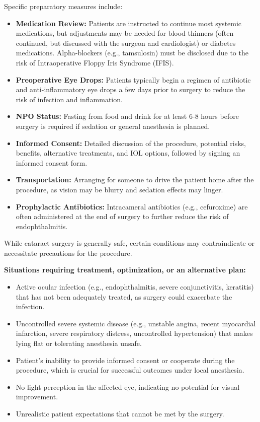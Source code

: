 Specific preparatory measures include:

\begin{itemize}
  \item \textbf{Medication Review:} Patients are instructed to continue most systemic medications, but adjustments may be needed for blood thinners (often continued, but discussed with the surgeon and cardiologist) or diabetes medications. Alpha-blockers (e.g., tamsulosin) must be disclosed due to the risk of Intraoperative Floppy Iris Syndrome (IFIS).
  \item \textbf{Preoperative Eye Drops:} Patients typically begin a regimen of antibiotic and anti-inflammatory eye drops a few days prior to surgery to reduce the risk of infection and inflammation.
  \item \textbf{NPO Status:} Fasting from food and drink for at least 6-8 hours before surgery is required if sedation or general anesthesia is planned.
  \item \textbf{Informed Consent:} Detailed discussion of the procedure, potential risks, benefits, alternative treatments, and IOL options, followed by signing an informed consent form.
  \item \textbf{Transportation:} Arranging for someone to drive the patient home after the procedure, as vision may be blurry and sedation effects may linger.
  \item \textbf{Prophylactic Antibiotics:} Intracameral antibiotics (e.g., cefuroxime) are often administered at the end of surgery to further reduce the risk of endophthalmitis.
\end{itemize}

While cataract surgery is generally safe, certain conditions may contraindicate or necessitate precautions for the procedure.

\textbf{Situations requiring treatment, optimization, or an alternative plan:}

\begin{itemize}
  \item Active ocular infection (e.g., endophthalmitis, severe conjunctivitis, keratitis) that has not been adequately treated, as surgery could exacerbate the infection.
  \item Uncontrolled severe systemic disease (e.g., unstable angina, recent myocardial infarction, severe respiratory distress, uncontrolled hypertension) that makes lying flat or tolerating anesthesia unsafe.
  \item Patient's inability to provide informed consent or cooperate during the procedure, which is crucial for successful outcomes under local anesthesia.
  \item No light perception in the affected eye, indicating no potential for visual improvement.
  \item Unrealistic patient expectations that cannot be met by the surgery.
\end{itemize}

